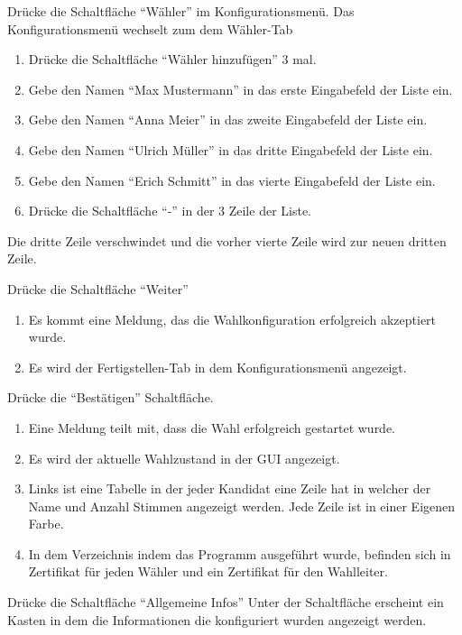 \documentclass[parskip=full]{scrartcl}
\begin{document}
\teststep{}
		{Drücke die Schaltfläche \enquote{Wähler} im Konfigurationsmenü.}
		{Das Konfigurationsmenü wechselt zum dem Wähler-Tab}

\teststep{}
		{\begin{enumerate}
				\item Drücke die Schaltfläche \enquote{Wähler hinzufügen} 3 mal.
				\item Gebe den Namen \enquote{Max Mustermann} in das erste Eingabefeld der Liste ein.
				\item Gebe den Namen \enquote{Anna Meier} in das zweite Eingabefeld der Liste ein.
				\item Gebe den Namen \enquote{Ulrich Müller} in das dritte Eingabefeld der Liste ein.
				\item Gebe den Namen \enquote{Erich Schmitt} in das vierte Eingabefeld der Liste ein.
				\item Drücke die Schaltfläche \enquote{-} in der 3 Zeile der Liste.
		\end{enumerate}}
		{Die dritte Zeile verschwindet und die vorher vierte Zeile wird zur neuen dritten Zeile.}

\teststep{}
		{Drücke die Schaltfläche \enquote{Weiter}}
		{\begin{enumerate}
				\item Es kommt eine Meldung, das die Wahlkonfiguration erfolgreich akzeptiert wurde.
				\item Es wird der Fertigstellen-Tab in dem Konfigurationsmenü angezeigt.
		\end{enumerate}}

\teststep{}
		{Drücke die \enquote{Bestätigen} Schaltfläche.}
		{\begin{enumerate}
				\item Eine Meldung teilt mit, dass die Wahl erfolgreich gestartet wurde.
				\item Es wird der aktuelle Wahlzustand in der GUI angezeigt.
				\item Links ist eine Tabelle in der jeder Kandidat eine Zeile hat in welcher der Name und Anzahl Stimmen angezeigt werden. Jede Zeile ist in einer Eigenen Farbe.
				\item In dem Verzeichnis indem das Programm ausgeführt wurde, befinden sich in Zertifikat für jeden Wähler und ein Zertifikat für den Wahlleiter.
		\end{enumerate}}

\teststep{}
		{Drücke die Schaltfläche \enquote{Allgemeine Infos}}
		{Unter der Schaltfläche erscheint ein Kasten in dem die Informationen die konfiguriert wurden angezeigt werden.}
\end{document}
